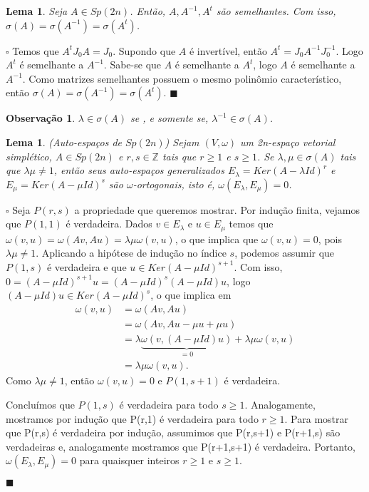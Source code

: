 \documentclass[12pt]{book}
\newtheorem{lema}[teorema]{Lema}
\newtheorem{observacao}[teorema]{Observação}
\newenvironment{prova}[1]{$\square$ #1}{\hfill$\blacksquare$}
\newcommand{\estruturacomplexa}{J_{0}}
\newcommand{\formaSimpletica}[2]{\omega(#1, #2)}
\newcommand{\gruposimpletico}[1]{Sp(#1)}
\newcommand{\inteiros}{\mathbb{Z}}
\begin{document}
	\begin{lema}\label{lema_caracterizacao_espectro_semelhante}
		Seja $A \in \gruposimpletico{2n}$. Então, $A, A^{-1}, A^{t}$ são semelhantes. Com isso, $\sigma(A) = \sigma(A^{-1}) = \sigma(A^{t}) $.
	\end{lema}
	\begin{prova}
		Temos que $A^{t}\estruturacomplexa A = \estruturacomplexa$. Supondo que $A$ é invertível, então $A^{t} = \estruturacomplexa A^{-1} \estruturacomplexa^{-1}$. Logo $A^{t}$ é semelhante a $A^{-1}$. Sabe-se que $A$ é semelhante a $A^{t}$, logo $A$ é semelhante a $A^{-1}$. Como matrizes semelhantes possuem o mesmo polinômio característico, então $\sigma(A) = \sigma(A^{-1}) = \sigma(A^{t}) $.
	\end{prova}
	
	\begin{observacao}
		$\lambda \in \sigma(A)$ se , e somente se, $\lambda^{-1}\in \sigma(A)$.
	\end{observacao}
	
	\begin{lema}\label{lema_auto_espaco_grupo_simpletico}
		(Auto-espaços de $\gruposimpletico{2n}$) Sejam $(V, \omega)$ um 2n-espaço vetorial simplético, $A \in \gruposimpletico{2n}$ e $r,s \in \inteiros$ tais que $r\geq 1$ e $s\geq 1$. Se $\lambda, \mu \in \sigma(A)$ tais que $\lambda\mu \neq 1$, então seus auto-espaços generalizados $E_{\lambda}=Ker(A-\lambda Id)^{r}$ e  $E_{\mu}=Ker(A-\mu Id)^{s}$ são $\omega$-ortogonais, isto é, $\omega(E_{\lambda}, E_{\mu}) = 0$.
	\end{lema}
	\begin{prova}
		Seja $P(r,s)$ a propriedade que queremos mostrar. Por indução finita, vejamos que $P(1,1)$ é verdadeira. Dados $v\in E_{\lambda}$ e $u\in E_{\mu}$ temos que $\formaSimpletica{v}{u} = \formaSimpletica{Av}{Au} = \lambda\mu\formaSimpletica{v}{u}$, o que implica que $\formaSimpletica{v}{u} = 0$, pois $\lambda\mu\neq 1$. Aplicando a hipótese de indução no índice $s$, podemos assumir que $P(1,s)$ é verdadeira e que $u \in Ker(A-\mu Id)^{s+1}$. Com isso, $0=(A-\mu Id)^{s+1}u = (A-\mu Id)^{s}(A-\mu Id)u $, logo $(A-\mu Id)u \in Ker(A-\mu Id)^{s}$, o que implica em
		$$
		\begin{aligned}
		\formaSimpletica{v}{u}
		&=\formaSimpletica{Av}{Au}
		\\
		&= \formaSimpletica{Av}{Au -\mu u +\mu u} 
		\\
		&= \lambda\underbrace{\formaSimpletica{v}{(A-\mu Id)u}}_{=0}+\lambda\mu\formaSimpletica{v}{u}
		\\
		&=\lambda\mu\formaSimpletica{v}{u}.
		\end{aligned}
		$$
		Como $\lambda\mu \neq 1$, então $\formaSimpletica{v}{u}=0$ e $P(1, s+1)$ é verdadeira.
		
		Concluímos que $P(1, s)$ é verdadeira para todo $s\geq 1$. Analogamente, mostramos por indução que P(r,1) é verdadeira para todo $r\geq 1$. Para mostrar que P(r,s) é verdadeira por indução, assumimos que P(r,s+1) e P(r+1,s) são verdadeiras e, analogamente mostramos que P(r+1,s+1) é verdadeira. Portanto, $\omega(E_{\lambda}, E_{\mu}) = 0$ para quaisquer inteiros $r\geq 1$ e $s\geq 1$.
		
	\end{prova}
	
\end{document}
